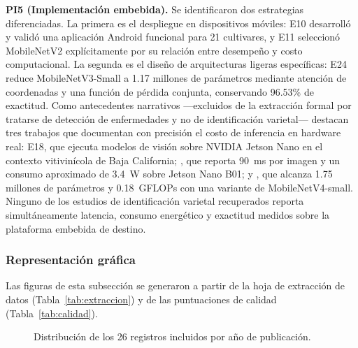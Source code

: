 \textbf{PI5 (Implementación embebida).} Se identificaron dos estrategias
diferenciadas. La primera es el despliegue en dispositivos móviles: E10
desarrolló y validó una aplicación Android funcional para 21 cultivares, y
E11 seleccionó MobileNetV2 explícitamente por su relación entre desempeño y
costo computacional. La segunda es el diseño de arquitecturas ligeras
específicas: E24 reduce MobileNetV3-Small a 1.17 millones de parámetros
mediante atención de coordenadas y una función de pérdida conjunta,
conservando 96.53\% de exactitud. Como antecedentes narrativos —excluidos de
la extracción formal por tratarse de detección de enfermedades y no de
identificación varietal— destacan tres trabajos que documentan con precisión
el costo de inferencia en hardware real: E18, que ejecuta modelos de visión
sobre NVIDIA Jetson Nano en el contexto vitivinícola de Baja California;
\citet{karim2024}, que reporta 90~ms por imagen y un consumo aproximado de
3.4~W sobre Jetson Nano B01; y \citet{chen2025}, que alcanza 1.75 millones de
parámetros y 0.18~GFLOPs con una variante de MobileNetV4-small. Ninguno de
los estudios de identificación varietal recuperados reporta simultáneamente
latencia, consumo energético y exactitud medidos sobre la plataforma
embebida de destino.

\subsubsection{Representación gráfica}

Las figuras de esta subsección se generaron a partir de la hoja de extracción
de datos (Tabla~\ref{tab:extraccion}) y de las puntuaciones de calidad
(Tabla~\ref{tab:calidad}).

\begin{figure}[htbp]
\centering
{}
\caption{Distribución de los 26 registros incluidos por año de publicación.}
\label{fig:anios}
\end{figure}

